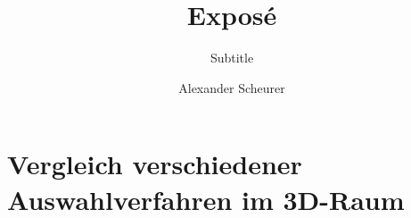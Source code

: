 

\author{Alexander Scheurer}
\title{Expos\'{e}}
\subtitle{Subtitle}
\publishers{Hochschule Furtwangen\\Fakultät Digitale Medien}



\begin{titlepage}

\end{titlepage}

\tableofcontents
\thispagestyle{empty}
\cleardoublepage




\section{Vergleich verschiedener Auswahlverfahren im 3D-Raum}
%
\clearpage
%
%
%
%



\clearpage
\appendix

\printbibliography[			%
	heading=bibintoc,
	title={Literaturverzeichnis}]
